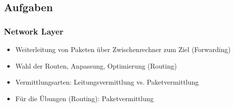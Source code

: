 \documentclass[xcolor=dvipsnames, aspectratio=169]{beamer}
\begin{document}
\subsection{Aufgaben}
\begin{frame}
	\frametitle{Network Layer}
	\begin{itemize}
		\item Weiterleitung von Paketen über Zwischenrechner zum Ziel (Forwarding)
		\item Wahl der Routen, Anpassung, Optimierung (Routing)
		\item Vermittlungsarten: Leitungsvermittlung vs. Paketvermittlung
		\item Für die Übungen (Routing): Paketvermittlung
	\end{itemize}
\end{frame}
\end{document}
